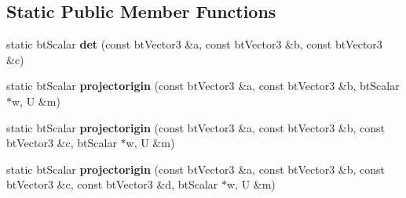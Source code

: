 \subsection*{Static Public Member Functions}
\begin{DoxyCompactItemize}
\item 
\mbox{\label{structgjkepa2__impl_1_1GJK_a8749f1a765d65393514efcd1b6092a1b}} 
static bt\+Scalar {\bfseries det} (const bt\+Vector3 \&a, const bt\+Vector3 \&b, const bt\+Vector3 \&c)
\item 
\mbox{\label{structgjkepa2__impl_1_1GJK_aee41f08026e70a25f007116118a87bed}} 
static bt\+Scalar {\bfseries projectorigin} (const bt\+Vector3 \&a, const bt\+Vector3 \&b, bt\+Scalar $\ast$w, U \&m)
\item 
\mbox{\label{structgjkepa2__impl_1_1GJK_abbb0c6f4e1d031edeffd3b90a18aa308}} 
static bt\+Scalar {\bfseries projectorigin} (const bt\+Vector3 \&a, const bt\+Vector3 \&b, const bt\+Vector3 \&c, bt\+Scalar $\ast$w, U \&m)
\item 
\mbox{\label{structgjkepa2__impl_1_1GJK_abfb3f7083d409d013152ff7c1a696bd4}} 
static bt\+Scalar {\bfseries projectorigin} (const bt\+Vector3 \&a, const bt\+Vector3 \&b, const bt\+Vector3 \&c, const bt\+Vector3 \&d, bt\+Scalar $\ast$w, U \&m)
\end{DoxyCompactItemize}
